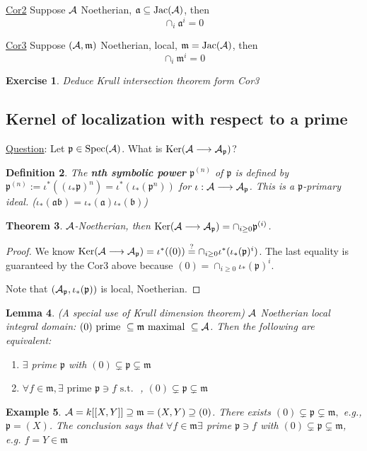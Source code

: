 \documentclass[11pt]{article}
\newtheorem{thm}{Theorem}[section]
\newtheorem{lemma}[thm]{Lemma}
\newtheorem{dfn}[thm]{Definition}
\newtheorem{ex}[thm]{Example}
\newtheorem{exercise}[thm]{Exercise}
\newcommand{\sca}{{\mathfrak a}}
\newcommand{\scb}{{\mathfrak b}}
\newcommand{\scm}{{\mathfrak m}}
\newcommand{\scp}{{\mathfrak p}}
\newcommand{\cala}{{\cal A}}
\newcommand{\lrta}{\longrightarrow}
\begin{document}
\underline{Cor2}  Suppose $\cala$ Noetherian, 
$\sca\subseteq \text{Jac}(\cala)$, then
$$\cap_i\sca^i=0$$

\underline{Cor3} Suppose $(\cala,\scm)$ Noetherian, local, $\scm=\text{Jac}(\cala)$, then
$$
\cap_i\scm^i=0
$$
\begin{exercise}
Deduce Krull intersection theorem form Cor3
\end{exercise}
\subsection*{Kernel of localization with respect to a prime}
\underline{Question}: Let $\scp\in \text{Spec}(\cala)$. What is $\text{Ker}(\cala\lrta \cala_\scp)$?
\begin{dfn}
The \textbf{nth symbolic power} $\scp^{(n)}$ of $\scp$ is defined by $\scp^{(n)}:=\iota^*((\iota_*\scp)^n)=\iota^*(\iota_*(\scp^n))$ for $\iota:\cala\lrta \cala_\scp$. This is a $\scp$-primary ideal. ($\iota_*(\sca\scb)=\iota_*(\sca)\iota_*(\scb)$)
\end{dfn}
\begin{thm}\label{thm:Noetherian_localization_kernel}
 $\cala$-Noetherian, then $ \text{Ker}(\cala\lrta \cala_\scp)=\cap_{i\geq 0}\scp^{(i)}$.
\end{thm}
\begin{proof}
We know $\text{Ker}(\cala\lrta \cala_\scp)=\iota^*((0))\overset{?}{=}\cap_{i\geq 0}\iota^*(\iota_*(\scp)^i)$.
 The last equality is guaranteed by the Cor3 above because $(0)=\cap_{i\geq 0}\iota_*(\scp)^i$. 

 Note that $(\cala_\scp,\iota_*(\scp))$ is local, Noetherian.
\end{proof}

\begin{lemma}\label{lem_5}
(A special use of Krull dimension theorem)
$\cala$ Noetherian local integral domain: $(0)\text{ prime } \subseteq \scm \text{ maximal }\subseteq \cala$. Then the following are equivalent:
\begin{enumerate}[label=(\roman*)]
\item $\exists $ prime $\scp$ with $(0)\subsetneq \scp\subsetneq \scm$
\item $\forall f\in\scm,\exists\text{ prime }\scp\ni f \text{ s.t. }$ , $(0)\subsetneq \scp\subsetneq \scm$
\end{enumerate}
\end{lemma}

\begin{ex}
$\cala=k[[X,Y]]\supseteq \scm=(X,Y)\supseteq (0)$. There exists $(0)\subsetneq\scp\subsetneq\scm,$ e.g., $\scp=(X)$. The conclusion says that $\forall f\in\scm\exists $ prime $\scp\ni f$ with  $(0)\subsetneq \scp\subsetneq \scm$, e.g. $f=Y\in\scm$
\end{ex}
\end{document}
